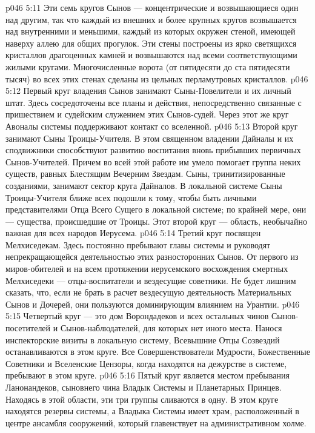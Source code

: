 \vs p046 5:11 Эти семь кругов Сынов --- концентрические и возвышающиеся один над другим, так что каждый из внешних и более крупных кругов возвышается над внутренними и меньшими, каждый из которых окружен стеной, имеющей наверху аллею для общих прогулок. Эти стены построены из ярко светящихся кристаллов драгоценных камней и возвышаются над всеми соответствующими жилыми кругами. Многочисленные ворота (от пятидесяти до ста пятидесяти тысяч) во всех этих стенах сделаны из цельных перламутровых кристаллов.
\vs p046 5:12 Первый круг владения Сынов занимают Сыны\hyp{}Повелители и их личный штат. Здесь сосредоточены все планы и действия, непосредственно связанные с пришествием и судейским служением этих Сынов\hyp{}судей. Через этот же круг Авоналы системы поддерживают контакт со вселенной.
\vs p046 5:13 Второй круг занимают Сыны Троицы\hyp{}Учителя. В этом священном владении Дайналы и их сподвижники способствуют развитию воспитания вновь прибывших первичных Сынов\hyp{}Учителей. Причем во всей этой работе им умело помогает группа неких существ, равных Блестящим Вечерним Звездам. Сыны, тринитизированные созданиями, занимают сектор круга Дайналов. В локальной системе Сыны Троицы\hyp{}Учителя ближе всех подошли к тому, чтобы быть личными представителями Отца Всего Сущего в локальной системе; по крайней мере, они --- существа, происшедшие от Троицы. Этот второй круг --- область, необычайно важная для всех народов Иерусема.
\vs p046 5:14 Третий круг посвящен Мелхиседекам. Здесь постоянно пребывают главы системы и руководят непрекращающейся деятельностью этих разносторонних Сынов. От первого из миров\hyp{}обителей и на всем протяжении иерусемского восхождения смертных Мелхиседеки --- отцы\hyp{}воспитатели и вездесущие советники. Не будет лишним сказать, что, если не брать в расчет вездесущую деятельность Материальных Сынов и Дочерей, они пользуются доминирующим влиянием на Урантии.
\vs p046 5:15 Четвертый круг --- это дом Ворондадеков и всех остальных чинов Сынов\hyp{}посетителей и Сынов\hyp{}наблюдателей, для которых нет иного места. Нанося инспекторские визиты в локальную систему, Всевышние Отцы Созвездий останавливаются в этом круге. Все Совершенствователи Мудрости, Божественные Советники и Вселенские Цензоры, когда находятся на дежурстве в системе, пребывают в этом круге.
\vs p046 5:16 Пятый круг является местом пребывания Ланонандеков, сыновнего чина Владык Системы и Планетарных Принцев. Находясь в этой области, эти три группы сливаются в одну. В этом круге находятся резервы системы, а Владыка Системы имеет храм, расположенный в центре ансамбля сооружений, который главенствует на административном холме.
